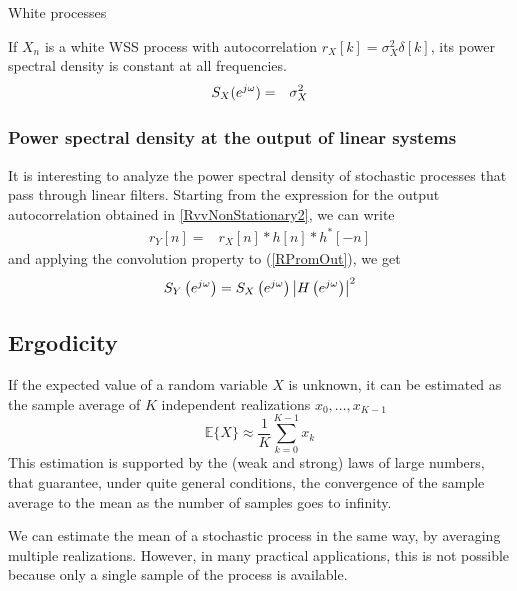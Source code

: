 \begin{example}{White processes}

If $X_n$ is a white WSS process with autocorrelation $r_X[k]=\sigma_X^2\delta[k]$, its power spectral density is constant at all frequencies.
\begin{eqnarray}
S_X(e^{j \omega}) &=& \sigma_X^2
\end{eqnarray}
\end{example}


\subsubsection{Power spectral density at the output of linear systems}

It is interesting to analyze the power spectral density of stochastic processes that pass through linear filters. Starting from the expression for the output autocorrelation obtained in \eqref{RvvNonStationary2}, we can write
\begin{eqnarray}
r_Y[n] =&  r_X[n] * h[n] * h^*[-n]
\label{RPromOut}
\end{eqnarray}
and applying the convolution property to (\ref{RPromOut}), we get
\begin{equation}
S_Y\left(e^{j \omega}\right) = S_X\left(e^{j \omega}\right) \left| H\left(e^{j \omega}\right) \right|^2
\label{depout}
\end{equation}


\subsection{Ergodicity}
\label{sec:Ergodicity}

If the expected value of a random variable $X$ is unknown, it can be estimated as the sample average of $K$ independent realizations $x_0,\ldots, x_{K-1}$
\begin{equation}
\mathbb{E}\{X\} \approx \frac{1}{K} \sum_{k=0}^{K-1} x_k
\end{equation}
This estimation is supported by the (weak and strong) laws of large numbers, that guarantee, under quite general conditions, the convergence of the sample average to the mean as the number of samples goes to infinity.

We can estimate the mean of a stochastic process in the same way, by averaging multiple realizations. However, in many practical applications, this is not possible because only a single sample of the process is available.

